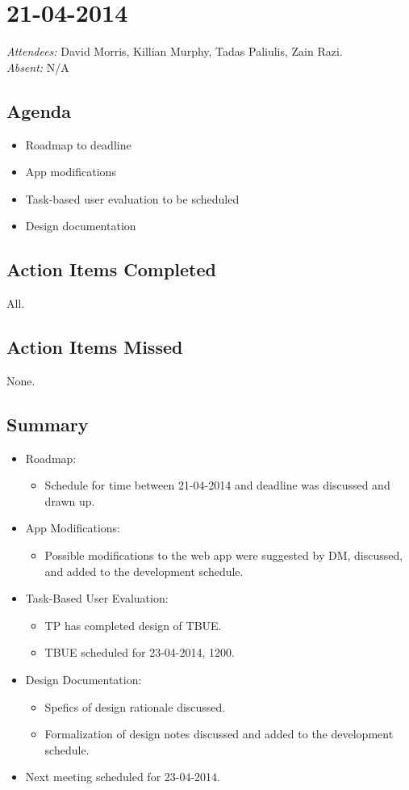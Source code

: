 \documentclass{article}
\begin{document}
\clearpage

\section*{21-04-2014}
\vspace{0.5cm}
\emph{Attendees: }David Morris, Killian Murphy, Tadas Paliulis, Zain Razi.
\\
\emph{Absent: }N/A

\subsection*{Agenda}
\begin{itemize}
\item Roadmap to deadline
\item App modifications
\item Task-based user evaluation to be scheduled
\item Design documentation
\end{itemize}

\subsection*{Action Items Completed}
All.

\subsection*{Action Items Missed}
None.

\subsection*{Summary}
\begin{itemize}
\item Roadmap:
  \begin{itemize}
  \item Schedule for time between 21-04-2014 and deadline was discussed and drawn up.
  \end{itemize}
\item App Modifications:
  \begin{itemize}
  \item Possible modifications to the web app were suggested by DM, discussed, and added to the development schedule.
  \end{itemize}
\item Task-Based User Evaluation:
  \begin{itemize}
  \item TP has completed design of TBUE.
  \item TBUE scheduled for 23-04-2014, 1200.
  \end{itemize}
\item Design Documentation:
  \begin{itemize}
  \item Spefics of design rationale discussed.
  \item Formalization of design notes discussed and added to the development schedule.
  \end{itemize}
\item Next meeting scheduled for 23-04-2014.
\end{itemize}
\end{document}
